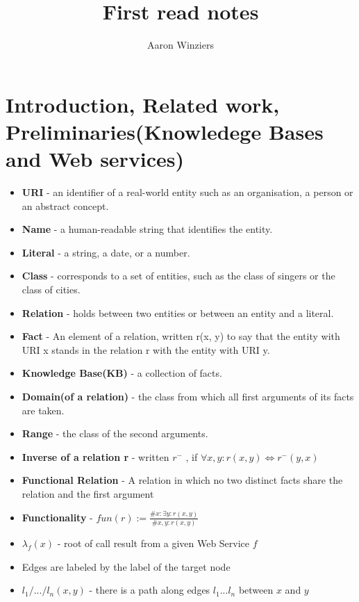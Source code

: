 \documentclass[10pt,a4paper]{article}
\author{Aaron Winziers}
\title{First read notes}
\begin{document}
	\section*{Introduction, Related work, Preliminaries(Knowledege Bases and Web services)}
\begin{itemize}
	\item \textbf{URI} - an identifier of a real-world entity such as an organisation, a person or an abstract concept. 
	
	\item \textbf{Name} - a human-readable string that identifies the entity. 
	
	\item \textbf{Literal} - a string, a date, or a number. 
	
	\item \textbf{Class} - corresponds to a set of entities, such as the class of singers or the class of cities.
	
	\item \textbf{Relation} - holds between two entities or between an entity and a literal. 
	
	\item \textbf{Fact} - An element of a relation, written r(x, y) to say that the entity with URI x stands in the relation r with the entity with URI y. 
	
	\item \textbf{Knowledge Base(KB)} - a collection of facts. 
	
	\item \textbf{Domain(of a relation)} - the class from which all first arguments of its facts are taken.
	
	\item \textbf{Range} - the class of the second arguments.
	
	\item \textbf{Inverse of a relation r} - written $r^{-}$ , if $\forall x,y: r(x, y) \Leftrightarrow r^{-}(y, x)$
	
	\item \textbf{Functional Relation} - A relation in which no two distinct facts share the relation and the first argument
	
	\item \textbf{Functionality} - $fun(r) := \frac{\#x : \exists y:r(x, y)}{\#x,y:r(x,y)}$
	
	\item $\lambda_{f}(x)$ - root of call result from a given Web Service $f$
	
	\item Edges are labeled by the label of the target node
	
	\item $l_{1}/.../l_{n}(x, y)$ - there is a path along edges $l_{1}...l_{n}$ between $x$ and $y$

\end{itemize}
\end{document}
